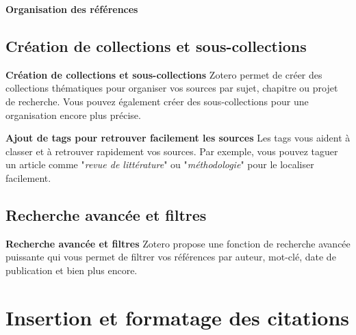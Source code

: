 \documentclass{beamer}
\begin{document}
\begin{frame}{\textbf{Organisation des références}}
	
\subsection{Création de collections et sous-collections}	
	
\begin{block}{\textbf{Création de collections et sous-collections}}
Zotero permet de créer des collections thématiques pour organiser vos sources par sujet, chapitre ou projet de recherche. Vous pouvez également créer des sous-collections pour une organisation encore plus précise.
\end{block}	

\begin{block}{\textbf{Ajout de tags pour retrouver facilement les sources}}
Les tags vous aident à classer et à retrouver rapidement vos sources. Par exemple, vous pouvez taguer un article comme "\textit{revue de littérature}" ou "\textit{méthodologie}" pour le localiser facilement.
\end{block}
	
\subsection{Recherche avancée et filtres}	
	
\begin{block}{\textbf{Recherche avancée et filtres}}
Zotero propose une fonction de recherche avancée puissante qui vous permet de filtrer vos références par auteur, mot-clé, date de publication et bien plus encore.
\end{block}
	
\end{frame}

\section{Insertion et formatage des citations}
\end{document}
